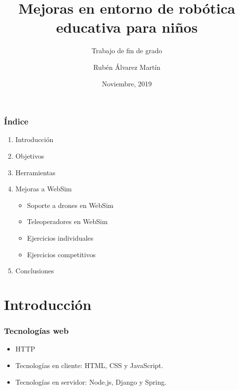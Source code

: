 \documentclass[xcolor={table}]{beamer}
\title{Mejoras en entorno de robótica  educativa para niños}
\subtitle{Trabajo de fin de grado}
\author[1]{Rubén Álvarez Martín}
\date{Noviembre, 2019}
\begin{document}
	\setcounter{showProgressBar}{0}
	\setcounter{showSlideNumbers}{0}

	\frame{\titlepage}

	\begin{frame}
		\frametitle{Índice}
		\begin{enumerate}
			\item Introducción  \textcolor{ExecusharesGrey}{}
		 \textcolor{ExecusharesGrey}{\footnotesize\hspace{0.5em}}
 		\item Objetivos  \textcolor{ExecusharesGrey}{}
		 \textcolor{ExecusharesGrey}{\footnotesize\hspace{0.5em}}
			\item Herramientas  \textcolor{ExecusharesGrey}{\footnotesize\hspace{0.5em}}
			\item Mejoras a WebSim  \textcolor{ExecusharesGrey}{
			\begin{itemize}
			    \item Soporte a drones en WebSim
			    \item Teleoperadores en WebSim
			    \item Ejercicios individuales
			    \item Ejercicios competitivos
			\end{itemize}} 
			\item Conclusiones  \textcolor{ExecusharesGrey}{\footnotesize\hspace{0.5em}}
		\end{enumerate}
	\end{frame}

	\setcounter{framenumber}{0}
	\setcounter{showProgressBar}{1}
	\setcounter{showSlideNumbers}{1}
	\section{Introducción}
		\begin{frame}
			\frametitle{Tecnologías web}
			\begin{itemize}
			    \item HTTP
			    \item Tecnologías en cliente: HTML, CSS y JavaScript. 
			    \item Tecnologías en servidor: Node.js, Django y Spring. 
			\end{itemize}
		\end{frame}
		
\end{document}

